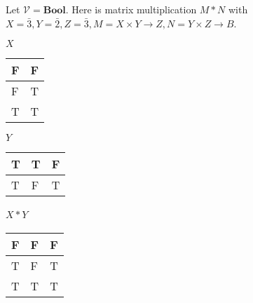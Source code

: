 Let $\mathcal{V}=\mathbf{Bool}$. Here is matrix multiplication $M*N$ with $X=\bar{3}, Y=\bar{2},Z=\bar{3},M=X\times Y\rightarrow Z, N=Y\times Z\rightarrow B$.

$X$ \begin{minipage}{0.48\textwidth}

  \begin{tabular}{|l|l|}
    \hline
    F & F \\ \hline
    F & T \\ \hline
    T & T \\ \hline
  \end{tabular}
\end{minipage}


$Y$

\begin{minipage}{0.48\textwidth}

  \begin{tabular}{|l|l|l|}
    \hline
    T & T & F \\ \hline
    T & F & T \\ \hline
  \end{tabular}
\end{minipage}

$X*Y$
\,
\begin{minipage}{0.48\textwidth}
  \begin{tabular}{|l|l|l|}
    \hline
    F & F & F \\ \hline
    T & F & T \\ \hline
    T & T & T \\ \hline
  \end{tabular}
\end{minipage}\,